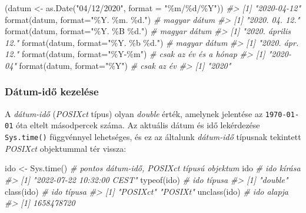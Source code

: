 \documentclass[
]{book}
\newenvironment{Shaded}{\begin{snugshade}}{\end{snugshade}}
\newcommand{\AttributeTok}[1]{\textcolor[rgb]{0.77,0.63,0.00}{#1}}
\newcommand{\CommentTok}[1]{\textcolor[rgb]{0.56,0.35,0.01}{\textit{#1}}}
\newcommand{\FunctionTok}[1]{\textcolor[rgb]{0.00,0.00,0.00}{#1}}
\newcommand{\NormalTok}[1]{#1}
\newcommand{\OtherTok}[1]{\textcolor[rgb]{0.56,0.35,0.01}{#1}}
\newcommand{\StringTok}[1]{\textcolor[rgb]{0.31,0.60,0.02}{#1}}
\begin{document}
\begin{Shaded}
\begin{Highlighting}[]
\NormalTok{(datum }\OtherTok{\textless{}{-}} \FunctionTok{as.Date}\NormalTok{(}\StringTok{"04/12/2020"}\NormalTok{, }\AttributeTok{format =} \StringTok{"\%m/\%d/\%Y"}\NormalTok{))}
\CommentTok{\#\textgreater{} [1] "2020{-}04{-}12"}
\FunctionTok{format}\NormalTok{(datum, }\AttributeTok{format=}\StringTok{"\%Y. \%m. \%d."}\NormalTok{) }\CommentTok{\# magyar dátum}
\CommentTok{\#\textgreater{} [1] "2020. 04. 12."}
\FunctionTok{format}\NormalTok{(datum, }\AttributeTok{format=}\StringTok{"\%Y. \%B \%d."}\NormalTok{)  }\CommentTok{\# magyar dátum}
\CommentTok{\#\textgreater{} [1] "2020. április 12."}
\FunctionTok{format}\NormalTok{(datum, }\AttributeTok{format=}\StringTok{"\%Y. \%b \%d."}\NormalTok{)  }\CommentTok{\# magyar dátum}
\CommentTok{\#\textgreater{} [1] "2020. ápr. 12."}
\FunctionTok{format}\NormalTok{(datum, }\AttributeTok{format=}\StringTok{"\%Y{-}\%m"}\NormalTok{)       }\CommentTok{\# csak az év és a hónap}
\CommentTok{\#\textgreater{} [1] "2020{-}04"}
\FunctionTok{format}\NormalTok{(datum, }\AttributeTok{format=}\StringTok{"\%Y"}\NormalTok{)          }\CommentTok{\# csak az év}
\CommentTok{\#\textgreater{} [1] "2020"}
\end{Highlighting}
\end{Shaded}

\hypertarget{duxe1tum-idux151-kezeluxe9se}{%
\subsubsection{Dátum-idő kezelése}\label{duxe1tum-idux151-kezeluxe9se}}

A \emph{dátum-idő} (\emph{POSIXct} típus) olyan \emph{double} érték, amelynek jelentése az \texttt{1970-01-01} óta eltelt másodpercek száma. Az aktuális dátum és idő lekérdezése \texttt{Sys.time()} függvénnyel lehetséges, és ez az általunk \emph{dátum-idő} típusnak tekintett \emph{POSIXct} objektummal tér vissza:

\begin{Shaded}
\begin{Highlighting}[]
\NormalTok{ido }\OtherTok{\textless{}{-}} \FunctionTok{Sys.time}\NormalTok{()     }\CommentTok{\# pontos dátum{-}idő, POSIXct típusú objektum}
\NormalTok{ido                   }\CommentTok{\# ido kírása}
\CommentTok{\#\textgreater{} [1] "2022{-}07{-}22 10:32:00 CEST"}
\FunctionTok{typeof}\NormalTok{(ido)           }\CommentTok{\# ido típusa}
\CommentTok{\#\textgreater{} [1] "double"}
\FunctionTok{class}\NormalTok{(ido)            }\CommentTok{\# ido típusa}
\CommentTok{\#\textgreater{} [1] "POSIXct" "POSIXt"}
\FunctionTok{unclass}\NormalTok{(ido)          }\CommentTok{\# ido alapja}
\CommentTok{\#\textgreater{} [1] 1658478720}
\end{Highlighting}
\end{Shaded}
\end{document}
